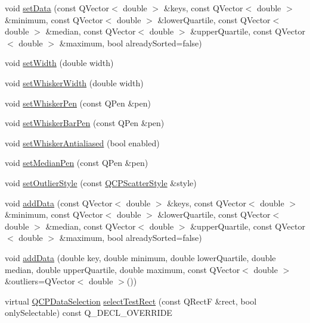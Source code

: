 \begin{DoxyCompactItemize}
\item 
void \hyperlink{class_q_c_p_statistical_box_a4ae198e66243d8cc57ad8893c37bf9d4}{set\+Data} (const Q\+Vector$<$ double $>$ \&keys, const Q\+Vector$<$ double $>$ \&minimum, const Q\+Vector$<$ double $>$ \&lower\+Quartile, const Q\+Vector$<$ double $>$ \&median, const Q\+Vector$<$ double $>$ \&upper\+Quartile, const Q\+Vector$<$ double $>$ \&maximum, bool already\+Sorted=false)
\item 
void \hyperlink{class_q_c_p_statistical_box_a0b62775bd67301b1eba5c785f2b26f14}{set\+Width} (double width)
\item 
void \hyperlink{class_q_c_p_statistical_box_adf378812446bd66f34d1f7f293d991cd}{set\+Whisker\+Width} (double width)
\item 
void \hyperlink{class_q_c_p_statistical_box_a4a5034cb3b9b040444df05ab1684620b}{set\+Whisker\+Pen} (const Q\+Pen \&pen)
\item 
void \hyperlink{class_q_c_p_statistical_box_aa8d3e503897788e1abf68dc74b5f147f}{set\+Whisker\+Bar\+Pen} (const Q\+Pen \&pen)
\item 
void \hyperlink{class_q_c_p_statistical_box_a61bcd458fba002f72304d11319051843}{set\+Whisker\+Antialiased} (bool enabled)
\item 
void \hyperlink{class_q_c_p_statistical_box_a7260ac55b669f5d0a74f16d5ca84c52c}{set\+Median\+Pen} (const Q\+Pen \&pen)
\item 
void \hyperlink{class_q_c_p_statistical_box_ad5241943422eb8e58360a97e99ad6aa7}{set\+Outlier\+Style} (const \hyperlink{class_q_c_p_scatter_style}{Q\+C\+P\+Scatter\+Style} \&style)
\item 
void \hyperlink{class_q_c_p_statistical_box_a9a8739c5b8291db8fd839e892fc8f478}{add\+Data} (const Q\+Vector$<$ double $>$ \&keys, const Q\+Vector$<$ double $>$ \&minimum, const Q\+Vector$<$ double $>$ \&lower\+Quartile, const Q\+Vector$<$ double $>$ \&median, const Q\+Vector$<$ double $>$ \&upper\+Quartile, const Q\+Vector$<$ double $>$ \&maximum, bool already\+Sorted=false)
\item 
void \hyperlink{class_q_c_p_statistical_box_a026f2790b530d6f29312254ecb1e7c1e}{add\+Data} (double key, double minimum, double lower\+Quartile, double median, double upper\+Quartile, double maximum, const Q\+Vector$<$ double $>$ \&outliers=Q\+Vector$<$ double $>$())
\item 
virtual \hyperlink{class_q_c_p_data_selection}{Q\+C\+P\+Data\+Selection} \hyperlink{class_q_c_p_statistical_box_a42febad6ad5e924a151434cc434b4ffc}{select\+Test\+Rect} (const Q\+RectF \&rect, bool only\+Selectable) const Q\+\_\+\+D\+E\+C\+L\+\_\+\+O\+V\+E\+R\+R\+I\+DE

\end{DoxyCompactItemize}
